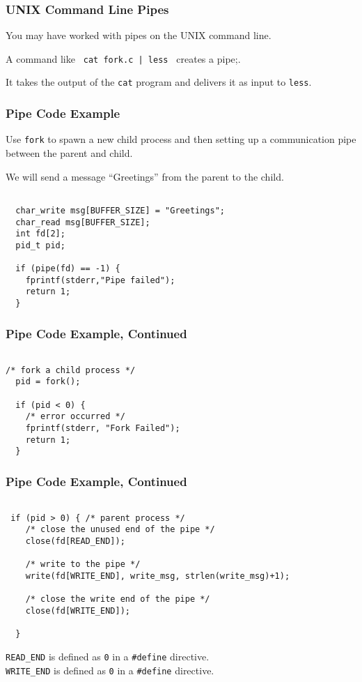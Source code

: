 \begin{frame}
\frametitle{UNIX Command Line Pipes}

You may have worked with pipes on the UNIX command line. 

A command like \texttt{ cat fork.c | less } creates a pipe;.

It takes the output of the \texttt{cat} program and delivers it as input to \texttt{less}.

\end{frame}

\begin{frame}[fragile]
\frametitle{Pipe Code Example}

Use \texttt{fork} to spawn a new child process and then setting up a communication pipe between the parent and child. 

We will send a message ``Greetings'' from the parent to the child.

\begin{verbatim}

  char_write msg[BUFFER_SIZE] = "Greetings"; 
  char_read msg[BUFFER_SIZE];
  int fd[2];
  pid_t pid;

  if (pipe(fd) == -1) {
    fprintf(stderr,"Pipe failed");
    return 1;
  }

\end{verbatim}


\end{frame}

\begin{frame}[fragile]
\frametitle{Pipe Code Example, Continued}

\begin{verbatim}

/* fork a child process */
  pid = fork();
  
  if (pid < 0) { 
    /* error occurred */ 
    fprintf(stderr, "Fork Failed"); 
    return 1;
  }

\end{verbatim}


\end{frame}

\begin{frame}[fragile]
\frametitle{Pipe Code Example, Continued}


\begin{verbatim}

 if (pid > 0) { /* parent process */
    /* close the unused end of the pipe */ 
    close(fd[READ_END]);
    
    /* write to the pipe */
    write(fd[WRITE_END], write_msg, strlen(write_msg)+1);
    
    /* close the write end of the pipe */
    close(fd[WRITE_END]);
    
  } 

\end{verbatim}

\texttt{READ\_END} is defined as \texttt{0} in a \texttt{\#define} directive.\\
\texttt{WRITE\_END} is defined as \texttt{0} in a \texttt{\#define} directive.\\

\end{frame}

